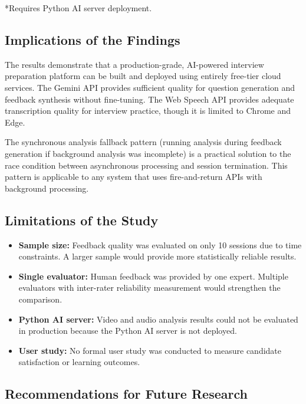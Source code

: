 *Requires Python AI server deployment.

\subsection{Implications of the Findings}

The results demonstrate that a production-grade, AI-powered interview preparation platform can be built and deployed using entirely free-tier cloud services. The Gemini API provides sufficient quality for question generation and feedback synthesis without fine-tuning. The Web Speech API provides adequate transcription quality for interview practice, though it is limited to Chrome and Edge.

The synchronous analysis fallback pattern (running analysis during feedback generation if background analysis was incomplete) is a practical solution to the race condition between asynchronous processing and session termination. This pattern is applicable to any system that uses fire-and-return APIs with background processing.

\subsection{Limitations of the Study}

\begin{itemize}
    \item \textbf{Sample size:} Feedback quality was evaluated on only 10 sessions due to time constraints. A larger sample would provide more statistically reliable results.
    \item \textbf{Single evaluator:} Human feedback was provided by one expert. Multiple evaluators with inter-rater reliability measurement would strengthen the comparison.
    \item \textbf{Python AI server:} Video and audio analysis results could not be evaluated in production because the Python AI server is not deployed.
    \item \textbf{User study:} No formal user study was conducted to measure candidate satisfaction or learning outcomes.
\end{itemize}

\subsection{Recommendations for Future Research}

